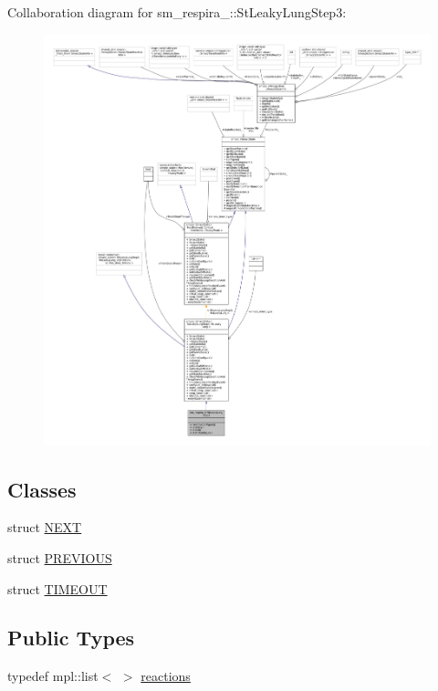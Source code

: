 Collaboration diagram for sm\+\_\+respira\+\_\+:\+:St\+Leaky\+Lung\+Step3\+:
\nopagebreak
\begin{figure}[H]
\begin{center}
\leavevmode
\includegraphics[width=350pt]{structsm__respira__1_1_1StLeakyLungStep3__coll__graph}
\end{center}
\end{figure}
\subsection*{Classes}
\begin{DoxyCompactItemize}
\item 
struct \hyperlink{structsm__respira__1_1_1StLeakyLungStep3_1_1NEXT}{N\+E\+XT}
\item 
struct \hyperlink{structsm__respira__1_1_1StLeakyLungStep3_1_1PREVIOUS}{P\+R\+E\+V\+I\+O\+US}
\item 
struct \hyperlink{structsm__respira__1_1_1StLeakyLungStep3_1_1TIMEOUT}{T\+I\+M\+E\+O\+UT}
\end{DoxyCompactItemize}
\subsection*{Public Types}
\begin{DoxyCompactItemize}
\item 
typedef mpl\+::list$<$ $>$ \hyperlink{structsm__respira__1_1_1StLeakyLungStep3_a5f16ee57548be4a1487c0dc6c9965737}{reactions}
\end{DoxyCompactItemize}
